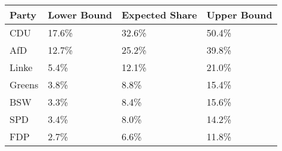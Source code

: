 \begin{tabular}{llll}
  \hline
Party & Lower Bound & Expected Share & Upper Bound \\ 
  \hline
CDU & 17.6\% & 32.6\% & 50.4\% \\ 
  AfD & 12.7\% & 25.2\% & 39.8\% \\ 
  Linke & 5.4\% & 12.1\% & 21.0\% \\ 
  Greens & 3.8\% & 8.8\% & 15.4\% \\ 
  BSW & 3.3\% & 8.4\% & 15.6\% \\ 
  SPD & 3.4\% & 8.0\% & 14.2\% \\ 
  FDP & 2.7\% & 6.6\% & 11.8\% \\ 
   \hline
\end{tabular}
